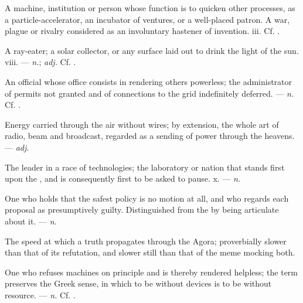   A machine, institution or person whose function is to quicken other processes, as a particle-accelerator, an incubator of ventures, or a well-placed patron.   A war, plague or rivalry considered as an involuntary hastener of invention.   iii. Cf. .

 A ray-eater; a solar collector, or any surface laid out to drink the light of the sun.   viii. ---  \textit{n.};  \textit{adj.} Cf. .

 An official whose office consists in rendering others powerless; the administrator of permits not granted and of connections to the grid indefinitely deferred. ---  \textit{n.} Cf. .

 Energy carried through the air without wires; by extension, the whole art of radio, beam and broadcast, regarded as a sending of power through the heavens. ---  \textit{adj.}

 The leader in a race of technologies; the laboratory or nation that stands first upon the , and is consequently first to be asked to pause.   x. ---  \textit{n.}

 One who holds that the safest policy is no motion at all, and who regards each proposal as presumptively guilty. Distinguished from the  by being articulate about it. ---  \textit{n.}

 The speed at which a truth propagates through the Agora; proverbially slower than that of its refutation, and slower still than that of the meme mocking both.  

 One who refuses machines on principle and is thereby rendered helpless; the term preserves the Greek sense, in which to be without devices is to be without resource. ---  \textit{n.} Cf. .


